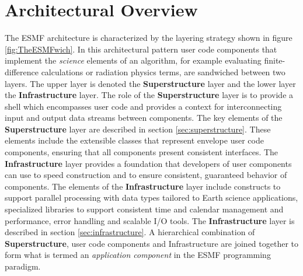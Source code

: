 
\section{Architectural Overview}
\label{sec:ArchOver}
The ESMF architecture is characterized by the layering strategy shown in figure \ref{fig:TheESMFwich}. In this architectural pattern user code components that implement the {\it science} elements of an algorithm, for example evaluating
finite-difference calculations or radiation physics terms, are sandwiched between two layers. The upper layer is
denoted the {\bf Superstructure} layer and the lower layer the {\bf Infrastructure} layer. The role of the {\bf Superstructure}
layer is to provide a shell which encompasses user code and provides a context for interconnecting input and output
data streams between components. The key elements of the {\bf Superstructure} layer are described in section \ref{sec:superstructure}.
These elements include the extensible classes that represent envelope user code components, ensuring that all
components present consistent interfaces. The {\bf Infrastructure} layer provides a foundation that developers of
user components can use to speed construction and to ensure consistent, guaranteed behavior of components.
The elements of the {\bf Infrastructure} layer include constructs to support parallel processing with data types tailored
to Earth science applications, specialized libraries to support consistent time and calendar management and
performance, error handling and scalable I/O tools. The {\bf Infrastructure} layer is described in section \ref{sec:infrastructure}.
A hierarchical combination of {\bf Superstructure}, user code components and Infrastructure are joined together
to form what is termed an {\it application component} in the ESMF programming paradigm.

